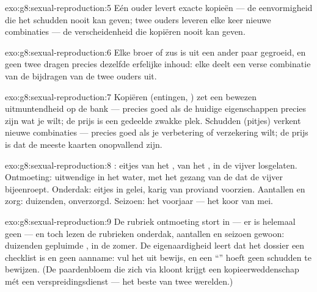 \begin{solution}{exo:g8:sexual-reproduction:5}
Eén ouder levert exacte kopieën --- de eenvormigheid die het schudden
nooit kan geven; twee ouders leveren elke keer nieuwe combinaties --- de
verscheidenheid die kopiëren nooit kan geven.
\end{solution}

\begin{solution}{exo:g8:sexual-reproduction:6}
Elke broer of zus is uit een ander paar  gegroeid, en geen twee
 dragen precies dezelfde erfelijke inhoud: elke  deelt
een verse combinatie van de bijdragen van de twee ouders uit.
\end{solution}

\begin{solution}{exo:g8:sexual-reproduction:7}
Kopiëren (entingen, ) zet een bewezen uitmuntendheid op de bank ---
precies goed als de huidige eigenschappen precies zijn wat je wilt; de
prijs is een gedeelde zwakke plek. Schudden (pitjes) verkent nieuwe
combinaties --- precies goed als je verbetering of verzekering wilt; de
prijs is dat de meeste kaarten onopvallend zijn.
\end{solution}

\begin{solution}{exo:g8:sexual-reproduction:8}
: eitjes van het ,  van het , in de vijver
losgelaten. Ontmoeting: uitwendige  in het water, met het
gezang van de  dat de vijver bijeenroept. Onderdak: eitjes in
gelei, karig van proviand voorzien. Aantallen en zorg: duizenden,
onverzorgd. Seizoen: het voorjaar --- het koor van mei.
\end{solution}

\begin{solution}{exo:g8:sexual-reproduction:9}
De rubriek ontmoeting stort in --- er is helemaal geen  --- en
toch lezen de rubrieken onderdak, aantallen en seizoen gewoon: duizenden
gepluimde , in de zomer. De eigenaardigheid leert dat het dossier een
checklist is en geen aanname: vul het uit bewijs, en een ``'' hoeft
geen schudden te bewijzen. (De paardenbloem die zich via  kloont
krijgt een kopieerweddenschap mét een verspreidingsdienst --- het beste
van twee werelden.)
\end{solution}

